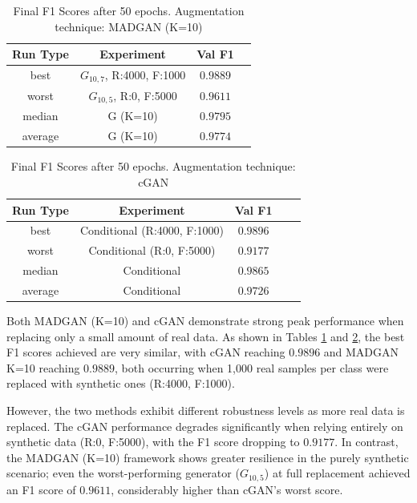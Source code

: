 \begin{table}[H]
	\vspace{-1.5em}
	\centering
	\begin{tabular}{|c|c|c|c|}
		\hline
		Run Type & Experiment & Val F1 \\ \hline
		best & \(G_{10, 7}\), R:4000, F:1000 & $0.9889$\\ \hline
		worst & \(G_{10, 5}\), R:0, F:5000 & $0.9611$\\ \hline
		median & G (K=10) & $0.9795$\\ \hline
		average & G (K=10) & $0.9774$
		\\ \hline
	\end{tabular}
    \caption{Final F1 Scores after 50 epochs. Augmentation technique: MADGAN (K=10)}
        \label{tab:res_replacement_mnist_ccgan_vs_madgan__madgan}
\end{table}
\begin{table}[H]
	\centering
	\vspace{-1.5em}
	\begin{tabular}{|c|c|c|c|c|}
		\hline
		Run Type & Experiment & Val F1 \\ \hline
		best & Conditional (R:4000, F:1000) & $0.9896$\\ \hline
		worst & Conditional (R:0, F:5000) & $0.9177$\\ \hline
		median & Conditional & $0.9865$\\ \hline
		average & Conditional & $0.9726$
		\\ \hline
	\end{tabular}
    \caption{Final F1 Scores after 50 epochs. Augmentation technique: cGAN}
        \label{tab:res_replacement_mnist_ccgan_vs_madgan__cgan}
\end{table}
Both MADGAN (K=10) and cGAN demonstrate strong peak performance when replacing only a small amount of real data. As shown in Tables \ref{tab:res_replacement_mnist_ccgan_vs_madgan__madgan} and \ref{tab:res_replacement_mnist_ccgan_vs_madgan__cgan}, the best F1 scores achieved are very similar, with cGAN reaching $0.9896$ and MADGAN K=10 reaching $0.9889$, both occurring when 1,000 real samples per class were replaced with synthetic ones (R:4000, F:1000).

However, the two methods exhibit different robustness levels as more real data is replaced. The cGAN performance degrades significantly when relying entirely on synthetic data (R:0, F:5000), with the F1 score dropping to $0.9177$. In contrast, the MADGAN (K=10) framework shows greater resilience in the purely synthetic scenario; even the worst-performing generator (\(G_{10,5}\)) at full replacement achieved an F1 score of $0.9611$, considerably higher than cGAN's worst score.

